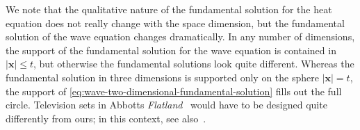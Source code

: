 We note that the qualitative nature of the fundamental solution for the heat equation does not really change with the space dimension, but the fundamental solution of the wave equation changes dramatically. In any number of dimensions, the support of the fundamental solution for the wave equation is contained in $|\bm{x}|\leq t$, but otherwise the fundamental solutions look quite different. Whereas the fundamental solution in three dimensions is supported only on the sphere $|\bm{x}|=t$, the support of \eqref{eq:wave-two-dimensional-fundamental-solution} fills out the full circle. Television sets in Abbott\textquotesingle s \emph{Flatland}~\cite{Ab} would have to be designed quite differently from ours; in this context, see also~\cite{Mo}.
